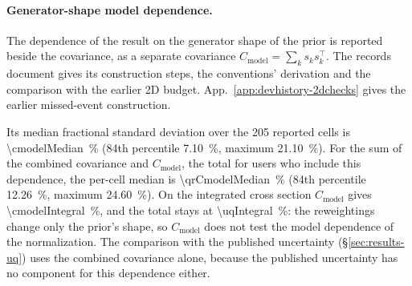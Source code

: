 \paragraph{Generator-shape model dependence.} The dependence of the result on the generator shape of the prior is reported beside the covariance, as a separate covariance $C_{\mathrm{model}}=\sum_k s_k s_k^{\top}$. The records document gives its construction steps, the conventions' derivation and the comparison with the earlier 2D budget. App.~\ref{app:devhistory-2dchecks} gives the earlier missed-event construction.

Its median fractional standard deviation over the 205 reported cells is \SI{\cmodelMedian}{\percent} (84th percentile \SI{7.10}{\percent}, maximum \SI{21.10}{\percent}). For the sum of the combined covariance and $C_{\mathrm{model}}$, the total for users who include this dependence, the per-cell median is \SI{\qrCmodelMedian}{\percent} (84th percentile \SI{12.26}{\percent}, maximum \SI{24.60}{\percent}). On the integrated cross section $C_{\mathrm{model}}$ gives \SI{\cmodelIntegral}{\percent}, and the total stays at \SI{\uqIntegral}{\percent}: the reweightings change only the prior's shape, so $C_{\mathrm{model}}$ does not test the model dependence of the normalization. The comparison with the published uncertainty (\S\ref{sec:results-uq}) uses the combined covariance alone, because the published uncertainty has no component for this dependence either. %

